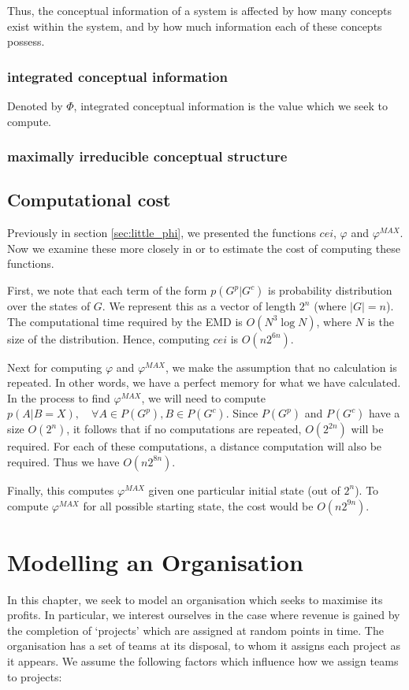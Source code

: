 Thus, the conceptual information of a system is affected by how many concepts exist within the system, and by how much information each of these concepts possess.
\subsubsection{integrated conceptual information}
Denoted by $\Phi$, integrated conceptual information is the value which we seek to compute.


\subsubsection{maximally irreducible conceptual structure}


\subsection{Computational cost}
Previously in section \ref{sec:little_phi}, we presented the functions $cei$, $\varphi$ and $\varphi^{MAX}$. Now we examine these more closely in or to estimate the cost of computing these functions. 

First, we note that each term of the form $p(G^p|G^c)$ is probability distribution over the states of $G$. We represent this as a vector of length $2^n$ (where $|G| = n$). The computational time required by the EMD is $O(N^3 \log N)$, where $N$ is the size of the distribution. Hence, computing $cei$ is $O(n2^{6n})$.

Next for computing $\varphi$ and $\varphi^{MAX}$, we make the assumption that no calculation is repeated. In other words, we have a perfect memory for what we have calculated. In the process to find $\varphi^{MAX}$, we will need to compute $p(A|B= X), \quad \forall A\in P(G^p), B\in P(G^c)$. Since $P(G^p)$ and $P(G^c)$ have a size $O(2^n)$, it follows that if no computations are repeated, $O(2^{2n})$ will be required. For each of these computations, a distance computation will also be required. Thus we have $O(n2^{8n})$. 

Finally, this computes $\varphi^{MAX}$ given one particular initial state (out of $2^n$). To compute $\varphi^{MAX}$ for all possible starting state, the cost would be $O(n2^{9n})$.

\section{Modelling an Organisation}

In this chapter, we seek to model an organisation which seeks to maximise its profits. In particular, we interest ourselves in the case where revenue is gained by the completion of `projects' which are assigned at random points in time. The organisation has a set of teams at its disposal, to whom it assigns each project as it appears. We assume the following factors which influence how we assign teams to projects:

